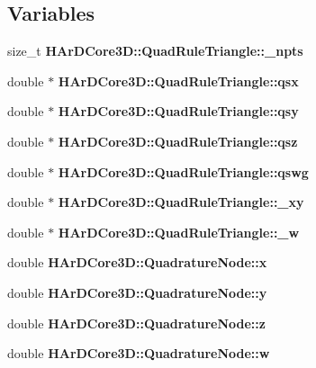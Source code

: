 \subsection*{Variables}
\begin{DoxyCompactItemize}
\item 
\mbox{\label{group__Quadratures_gaecf0514e3812232ca758bab779318ca3}} 
size\+\_\+t {\bfseries H\+Ar\+D\+Core3\+D\+::\+Quad\+Rule\+Triangle\+::\+\_\+npts}
\item 
\mbox{\label{group__Quadratures_ga190d4d4627fc6c632dd7829951bde3d7}} 
double $\ast$ {\bfseries H\+Ar\+D\+Core3\+D\+::\+Quad\+Rule\+Triangle\+::qsx}
\item 
\mbox{\label{group__Quadratures_ga84ce0aad8aa167e51fedc36b4ff6b532}} 
double $\ast$ {\bfseries H\+Ar\+D\+Core3\+D\+::\+Quad\+Rule\+Triangle\+::qsy}
\item 
\mbox{\label{group__Quadratures_ga6e639977bf10e2d195168fe13fb6278b}} 
double $\ast$ {\bfseries H\+Ar\+D\+Core3\+D\+::\+Quad\+Rule\+Triangle\+::qsz}
\item 
\mbox{\label{group__Quadratures_ga9637eb56f3d5b1e50b4444e0abda70d2}} 
double $\ast$ {\bfseries H\+Ar\+D\+Core3\+D\+::\+Quad\+Rule\+Triangle\+::qswg}
\item 
\mbox{\label{group__Quadratures_ga23e20aac779af8eb9a8d75b2e330b706}} 
double $\ast$ {\bfseries H\+Ar\+D\+Core3\+D\+::\+Quad\+Rule\+Triangle\+::\+\_\+xy}
\item 
\mbox{\label{group__Quadratures_gafdb1f7da129756e5ca6ff329cd366928}} 
double $\ast$ {\bfseries H\+Ar\+D\+Core3\+D\+::\+Quad\+Rule\+Triangle\+::\+\_\+w}
\item 
\mbox{\label{group__Quadratures_ga2a30df67610b141f56b65c1324068143}} 
double {\bfseries H\+Ar\+D\+Core3\+D\+::\+Quadrature\+Node\+::x}
\item 
\mbox{\label{group__Quadratures_gad1a6b5b68c8e5bfce6d4753d091efa22}} 
double {\bfseries H\+Ar\+D\+Core3\+D\+::\+Quadrature\+Node\+::y}
\item 
\mbox{\label{group__Quadratures_gac5e2438567a78de1430595b4f8ccd1fc}} 
double {\bfseries H\+Ar\+D\+Core3\+D\+::\+Quadrature\+Node\+::z}
\item 
\mbox{\label{group__Quadratures_gace3667769fdabe08dd83fe6eb5201643}} 
double {\bfseries H\+Ar\+D\+Core3\+D\+::\+Quadrature\+Node\+::w}
\end{DoxyCompactItemize}


